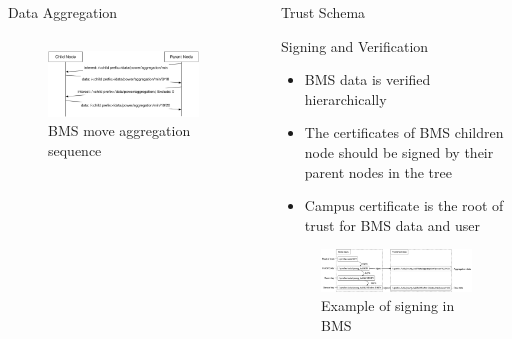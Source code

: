 \documentclass[final,hyperref={pdfpagelabels=false},20pt]{beamer}
\begin{document}
\begin{frame}[t]
\begin{columns}[t]
\begin{column}{.465\textwidth}
\begin{block}{Data Aggregation}
\begin{columns}[T]
\begin{column}{.56\textwidth}
\begin{figure}
\includegraphics[width=\linewidth]{bms-move-aggregate-sequence}
\caption{BMS move aggregation sequence}
\label{fig:move-aggregation}
\end{figure}
\end{column}

\end{columns}

\end{block}

\end{column} %

\begin{column}{.02\textwidth}\end{column} %
 
\begin{column}{.465\textwidth} %


\begin{block}{Trust Schema}

Signing and Verification

\begin{itemize}
\item{BMS data is verified hierarchically}
\item{The certificates of BMS children node should be signed by their parent nodes in the tree}
\item{Campus certificate is the root of trust for BMS data and user}
\end{itemize}

\begin{figure}
\includegraphics[width=0.95\linewidth]{bms-signing-verification}
\caption{Example of signing in BMS}
\label{fig:bms-signing-example}
\end{figure}


\end{block}
\end{column}
\end{columns}
\end{frame}
\end{document}
